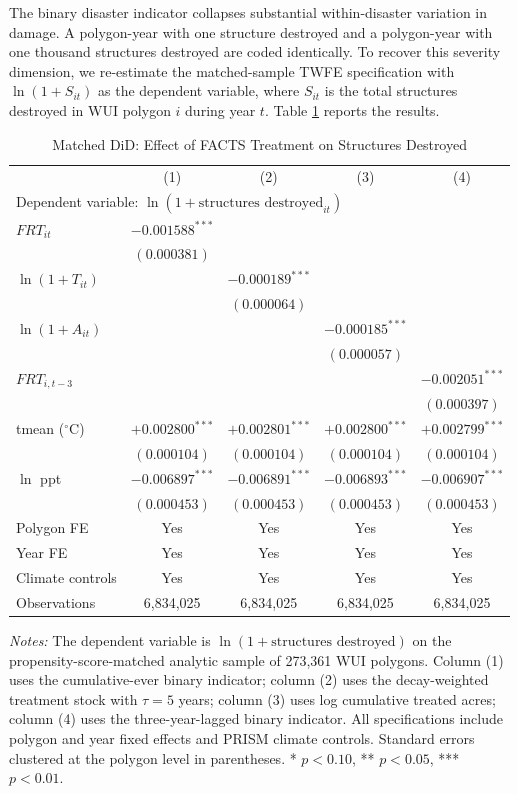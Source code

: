 \documentclass[12pt, letterpaper]{article}
\begin{document}
The binary disaster indicator collapses substantial within-disaster variation in damage. A polygon-year with one structure destroyed and a polygon-year with one thousand structures destroyed are coded identically. To recover this severity dimension, we re-estimate the matched-sample TWFE specification with $\ln(1 + S_{it})$ as the dependent variable, where $S_{it}$ is the total structures destroyed in WUI polygon $i$ during year $t$. Table \ref{tab:severity} reports the results.

\begin{table}[H]
\centering
\small
\begin{threeparttable}
\caption{Matched DiD: Effect of FACTS Treatment on Structures Destroyed}
\label{tab:severity}
\begin{tabular}{lcccc}
\toprule
& (1) & (2) & (3) & (4) \\
\multicolumn{5}{l}{Dependent variable: $\ln(1 + \text{structures destroyed}_{it})$} \\
\midrule
$FRT_{it}$ & $-0.001588^{***}$ & & & \\
& $(0.000381)$ & & & \\
$\ln(1+T_{it})$ & & $-0.000189^{***}$ & & \\
& & $(0.000064)$ & & \\
$\ln(1+A_{it})$ & & & $-0.000185^{***}$ & \\
& & & $(0.000057)$ & \\
$FRT_{i,t-3}$ & & & & $-0.002051^{***}$ \\
& & & & $(0.000397)$ \\
tmean ($^\circ$C) & $+0.002800^{***}$ & $+0.002801^{***}$ & $+0.002800^{***}$ & $+0.002799^{***}$ \\
& $(0.000104)$ & $(0.000104)$ & $(0.000104)$ & $(0.000104)$ \\
$\ln$ ppt & $-0.006897^{***}$ & $-0.006891^{***}$ & $-0.006893^{***}$ & $-0.006907^{***}$ \\
& $(0.000453)$ & $(0.000453)$ & $(0.000453)$ & $(0.000453)$ \\
\midrule
Polygon FE & Yes & Yes & Yes & Yes \\
Year FE & Yes & Yes & Yes & Yes \\
Climate controls & Yes & Yes & Yes & Yes \\
Observations & 6{,}834{,}025 & 6{,}834{,}025 & 6{,}834{,}025 & 6{,}834{,}025 \\
\bottomrule
\end{tabular}
\begin{tablenotes}
\small
\item \textit{Notes:} The dependent variable is $\ln(1 + \text{structures destroyed})$ on the propensity-score-matched analytic sample of 273{,}361 WUI polygons. Column (1) uses the cumulative-ever binary indicator; column (2) uses the decay-weighted treatment stock with $\tau = 5$ years; column (3) uses log cumulative treated acres; column (4) uses the three-year-lagged binary indicator. All specifications include polygon and year fixed effects and PRISM climate controls. Standard errors clustered at the polygon level in parentheses. * $p<0.10$, ** $p<0.05$, *** $p<0.01$.

\end{tablenotes}
\end{threeparttable}
\end{table}
\end{document}
